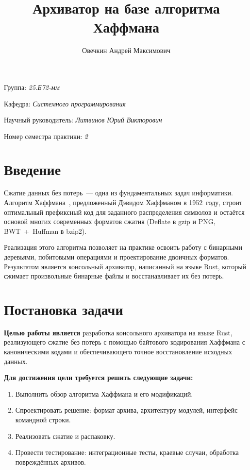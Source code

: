 \documentclass[a4paper]{article}
\title{Архиватор на базе алгоритма Хаффмана}
\author{Овечкин Андрей Максимович}
\date{}
\begin{document}
\maketitle

\begin{flushright}
    Группа: \emph{25.Б72-мм}

    Кафедра: \emph{Системного программирования}

    Научный руководитель: \emph{Литвинов Юрий Викторович}
    
    Номер семестра практики: \emph{2}
\end{flushright} 

\section{Введение}
Сжатие данных без потерь~--- одна из фундаментальных задач информатики. 
Алгоритм Хаффмана~\cite{huffman1952}, предложенный Дэвидом Хаффманом в 1952~году, строит 
оптимальный префиксный код для заданного распределения символов и остаётся 
основой многих современных форматов сжатия (Deflate в gzip и PNG, 
BWT~+~Huffman в bzip2). 

Реализация этого алгоритма позволяет на практике освоить работу с бинарными 
деревьями, побитовыми операциями и проектирование двоичных форматов. 
Результатом является консольный архиватор, 
написанный на языке Rust, который сжимает произвольные бинарные файлы 
и восстанавливает их без потерь.
\section{Постановка задачи}

\textbf{Целью работы является} разработка консольного архиватора на языке 
Rust, реализующего сжатие без потерь с помощью байтового кодирования 
Хаффмана с каноническими кодами и обеспечивающего точное восстановление 
исходных данных.

\textbf{Для достижения цели требуется решить следующие задачи:}
\begin{enumerate}
    \item Выполнить обзор алгоритма Хаффмана и его модификаций.
    \item Спроектировать решение: формат архива, архитектуру модулей, 
          интерфейс командной строки.
    \item Реализовать сжатие и распаковку.
    \item Провести тестирование: интеграционные тесты, краевые случаи, 
          обработка повреждённых архивов.
\end{enumerate}
\end{document}
